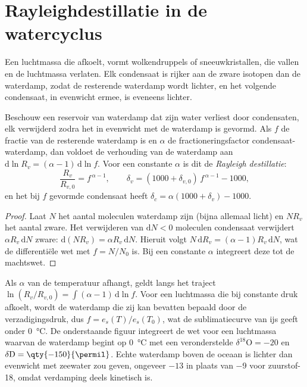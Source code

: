 \section{Rayleighdestillatie in de watercyclus}\label{sec:b3:stable-isotopes:rayleigh}

Een luchtmassa die afkoelt, vormt wolkendruppels of sneeuwkristallen, die vallen en
de luchtmassa verlaten. Elk condensaat is rijker aan de zware isotopen dan de waterdamp, zodat de
resterende waterdamp wordt lichter, en het volgende condensaat, in evenwicht ermee, is
eveneens lichter.

\begin{proposition}[Rayleighdestillatie]\label{prop:b3:stable-isotopes:rayleigh-distillation}
Beschouw een reservoir van waterdamp dat zijn water verliest door condensaten, elk verwijderd zodra
het in evenwicht met de waterdamp is gevormd. Als $f$ de fractie van de
resterende waterdamp is en $\alpha$ de fractioneringsfactor condensaat-waterdamp, dan
voldoet de verhouding van de waterdamp aan $\mathrm d\ln R_v = (\alpha - 1)\,\mathrm d\ln f$. Voor
een constante $\alpha$ is dit de \emph{Rayleigh
destillatie}:
\[
\frac{R_v}{R_{v,0}} = f^{\,\alpha - 1}, \qquad
\delta_v = (1000 + \delta_{v,0})\,f^{\,\alpha - 1} - 1000,
\]
en het bij $f$ gevormde condensaat heeft $\delta_c = \alpha(1000 + \delta_v) - 1000$.
\end{proposition}

\begin{proof}
Laat $N$ het aantal moleculen waterdamp zijn (bijna allemaal licht) en $N R_v$
het aantal zware. Het verwijderen van $\mathrm dN < 0$ moleculen condensaat
verwijdert $\alpha R_v\,\mathrm dN$ zware: $\mathrm d(NR_v) = \alpha
R_v\,\mathrm dN$. Hieruit volgt $N\,\mathrm dR_v = (\alpha - 1)R_v\,\mathrm dN$, wat de
differentiële wet met $f = N/N_0$ is. Bij een constante $\alpha$ integreert deze tot
de machtswet.
\end{proof}

Als $\alpha$ van de temperatuur afhangt, geldt langs het traject $\ln(R_v/R_{v,0}) = \int(\alpha - 1)\,
\mathrm d\ln f$. Voor een luchtmassa die bij constante druk afkoelt,
wordt de waterdamp die zij kan bevatten bepaald door de verzadigingsdruk, dus $f =
e_s(T)/e_s(T_0)$, wat de sublimatiecurve van ijs geeft onder
\qty{0}{\celsius}. De onderstaande figuur integreert de wet voor een luchtmassa waarvan de
waterdamp begint op \qty{0}{\celsius} met een veronderstelde $\delta^{18}\mathrm O = -20$
en $\delta\mathrm D = \qty{-150}{\permil}$. Echte waterdamp boven de oceaan is
lichter dan evenwicht met zeewater zou geven, ongeveer $-13$ in plaats van
\qty{-9}{\permil} voor zuurstof-18, omdat verdamping deels kinetisch is.

